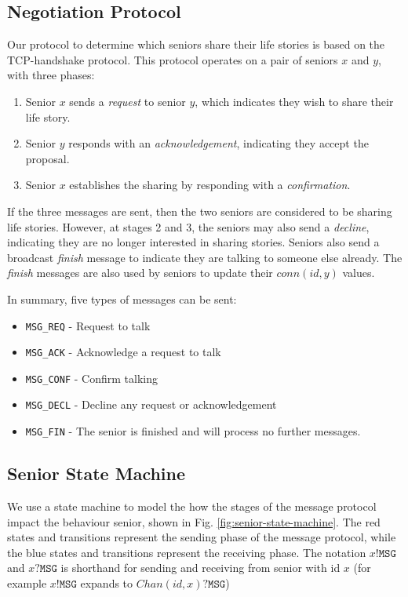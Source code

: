 \documentclass[12pt,a4paper]{scrartcl}
\begin{document}
\subsection{Negotiation Protocol}
Our protocol to determine which seniors share their life stories is based on the TCP-handshake protocol.
This protocol operates on a pair of seniors $x$ and $y$, with three phases:
\begin{enumerate}
    \item Senior $x$ sends a \emph{request} to senior $y$, which indicates they wish to share their life story.
    \item Senior $y$ responds with an \emph{acknowledgement}, indicating they accept the proposal.
    \item Senior $x$ establishes the sharing by responding with a \emph{confirmation}.
\end{enumerate}

If the three messages are sent, then the two seniors are considered to be sharing life stories.
However, at stages 2 and 3, the seniors may also send a \emph{decline}, indicating they are no longer interested in sharing stories.
Seniors also send a broadcast \emph{finish} message to indicate they are talking to someone else already.
The \emph{finish} messages are also used by seniors to update their $conn(id,y)$ values.

In summary, five types of messages can be sent:
\begin{itemize}
    \item \texttt{MSG\_REQ} - Request to talk
    \item \texttt{MSG\_ACK} - Acknowledge a request to talk
    \item \texttt{MSG\_CONF} - Confirm talking
    \item \texttt{MSG\_DECL} - Decline any request or acknowledgement
    \item \texttt{MSG\_FIN} - The senior is finished and will process no further messages.
\end{itemize}

\subsection{Senior State Machine}
We use a state machine to model the how the stages of the message protocol impact the behaviour senior, shown in Fig. \ref{fig:senior-state-machine}.
The red states and transitions represent the sending phase of the message protocol, while the blue states and transitions represent the receiving phase.
The notation $x!\texttt{MSG}$ and $x?\texttt{MSG}$ is shorthand for sending and receiving from senior with id $x$ (for example $x!\texttt{MSG}$ expands to $Chan(id,x)?\texttt{MSG}$)
\end{document}

